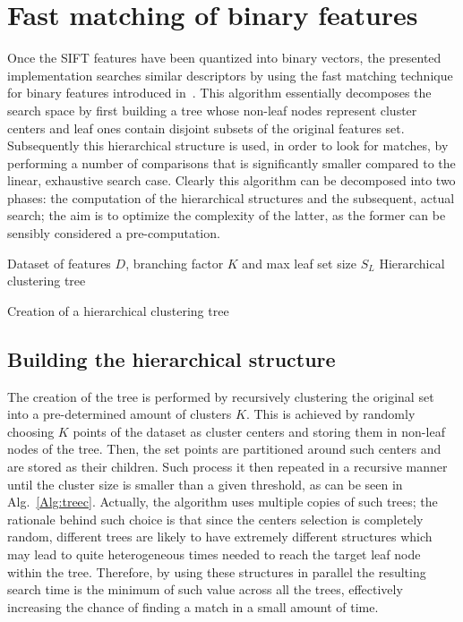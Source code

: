 \documentclass[a4paper, 11pt, oneside]{article}
\begin{document}
\section*{Fast matching of binary features}
Once the SIFT features have been quantized into binary vectors, the presented implementation searches similar descriptors by using the fast matching technique for binary features introduced in~\cite{muja2012fast}. This algorithm essentially decomposes the search space by first building a tree whose non-leaf nodes represent cluster centers and leaf ones contain disjoint subsets of the original features set. Subsequently this hierarchical structure is used, in order to look for matches, by performing a number of comparisons that is significantly smaller compared to the linear, exhaustive search case. Clearly this algorithm can be decomposed into two phases: the computation of the hierarchical structures and the subsequent, actual search; the aim is to optimize the complexity of the latter, as the former can be sensibly considered a pre-computation.

\begin{algorithm}[h!]
  \begin{algorithmic}[1]
    \REQUIRE Dataset of features $D$, branching factor $K$ and max leaf set size $S_{L}$
    \ENSURE Hierarchical clustering tree
    \ELSE
    \ENDFOR
    \ENDIF
  \end{algorithmic}
  \caption{Creation of a hierarchical clustering tree}\label{Alg:treec}
\end{algorithm}

\subsection*{Building the hierarchical structure}
The creation of the tree is performed by recursively clustering the original set into a pre-determined amount of clusters $K$. This is achieved by randomly choosing $K$ points of the dataset as cluster centers and storing them in non-leaf nodes of the tree. Then, the set points are partitioned around such centers and are stored as their children. Such process it then repeated in a recursive manner until the cluster size is smaller than a given threshold, as can be seen in Alg.~\ref{Alg:treec}.
Actually, the algorithm uses multiple copies of such trees; the rationale behind such choice is that since the centers selection is completely random, different trees are likely to have extremely different structures which may lead to quite heterogeneous times needed to reach the target leaf node within the tree. Therefore, by using these structures in parallel the resulting search time is the minimum of such value across all the trees, effectively increasing the chance of finding a match in a small amount of time.
\end{document}
